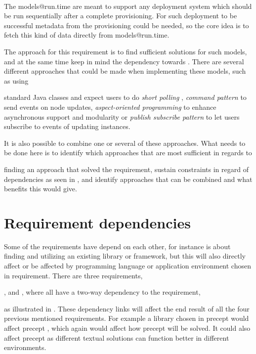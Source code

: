  \\
The models@run.time are meant to support any deployment system which should
be run sequentially after a complete provisioning.
For such deployment to be successful metadata from the provisioning could be needed,
so the core idea is to fetch this kind of data directly from models@run.time.

The approach for this requirement is to find sufficient solutions for such models,
and at the same time keep in mind the dependency towards .
There are several different approaches that could be made when implementing 
these models, such as using
\begin{ii}
  \iitem standard Java classes and expect users to do \emph{short polling} ,
  \iitem \emph{command pattern} to send events on node updates,
  \iitem \emph{aspect-oriented programming} to enhance asynchronous support and modularity or
  \iitem \emph{publish subscribe pattern} to let users subscribe to events of updating instances.
\end{ii}
It is also possible to combine one or several of these approaches.
What needs to be done here is to identify which approaches that are most sufficient 
in regards to 
\begin{ii} 
  \iitem finding an approach that solved the requirement,
  \iitem sustain constraints in regard of dependencies as seen in , and
  \iitem identify approaches that can be combined and what benefits this would give.
\end{ii} 

\section{Requirement dependencies}


Some of the requirements have depend on each other, for instance  is about finding
and utilizing an existing library or framework, but this will also directly affect or be affected by
programming language or application environment chosen in  requirement.
There are three requirements, 
\begin{ii}
  \iitem {},
  \iitem {} and
  \iitem {},
    where all have a two-way dependency to the 
  \iitem {} requirement,
\end{ii}
as illustrated in .
These dependency links will affect the end result of all the four previous mentioned requirements.
For example a library chosen in precept  would affect precept , which again would affect
how precept  will be solved. 
It could also affect precept  as different textual solutions can function better in
different environments.

